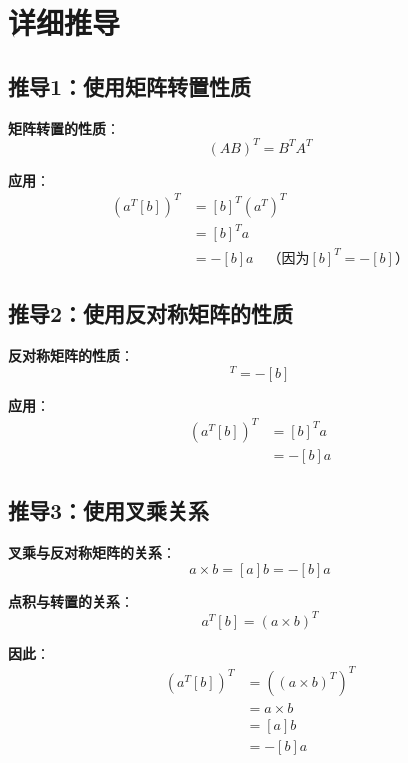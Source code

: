 \documentclass[12pt,a4paper]{article}
\begin{document}
\section{详细推导}

\subsection{推导1：使用矩阵转置性质}

\textbf{矩阵转置的性质}：
\begin{equation}
(AB)^T = B^T A^T
\end{equation}

\textbf{应用}：
\begin{align}
(a^T [b])^T &= [b]^T (a^T)^T \\
&= [b]^T a \\
&= -[b] a \quad \text{（因为$[b]^T = -[b]$）}
\end{align}

\subsection{推导2：使用反对称矩阵的性质}

\textbf{反对称矩阵的性质}：
\begin{equation}
[b]^T = -[b]
\end{equation}

\textbf{应用}：
\begin{align}
(a^T [b])^T &= [b]^T a \\
&= -[b] a
\end{align}

\subsection{推导3：使用叉乘关系}

\textbf{叉乘与反对称矩阵的关系}：
\begin{equation}
a \times b = [a] b = -[b] a
\end{equation}

\textbf{点积与转置的关系}：
\begin{equation}
a^T [b] = (a \times b)^T
\end{equation}

\textbf{因此}：
\begin{align}
(a^T [b])^T &= ((a \times b)^T)^T \\
&= a \times b \\
&= [a] b \\
&= -[b] a
\end{align}
\end{document}
